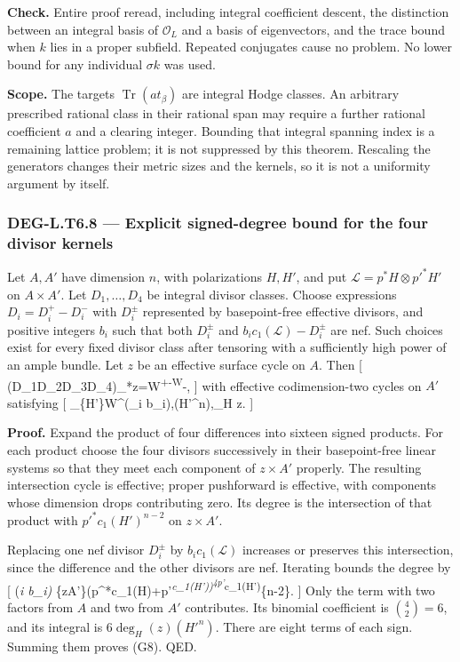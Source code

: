 \documentclass[11pt,a4paper]{article}
\theoremstyle{definition}
\begin{document}
\textbf{Check.} Entire proof reread, including integral coefficient
descent, the distinction between an integral basis of \(\mathcal O_L\)
and a basis of eigenvectors, and the trace bound when \(k\) lies in a
proper subfield. Repeated conjugates cause no problem. No lower bound
for any individual \(\sigma k\) was used.

\textbf{Scope.} The targets \(\operatorname{Tr}(a t_\beta)\) are
integral Hodge classes. An arbitrary prescribed rational class in their
rational span may require a further rational coefficient \(a\) and a
clearing integer. Bounding that integral spanning index is a remaining
lattice problem; it is not suppressed by this theorem. Rescaling the
generators changes their metric sizes and the kernels, so it is not a
uniformity argument by itself.

\subsubsection{DEG-L.T6.8 --- Explicit signed-degree bound for the four
divisor
kernels}\label{deg-l.t6.8-explicit-signed-degree-bound-for-the-four-divisor-kernels}

Let \(A,A'\) have dimension \(n\), with polarizations \(H,H'\), and put
\(\mathscr L=p^*H\otimes p'^*H'\) on \(A\times A'\). Let
\(D_1,\ldots,D_4\) be integral divisor classes. Choose expressions
\(D_i=D_i^+-D_i^-\) with \(D_i^\pm\) represented by basepoint-free
effective divisors, and positive integers \(b_i\) such that both
\(D_i^\pm\) and \(b_i c_1(\mathscr L)-D_i^\pm\) are nef. Such choices
exist for every fixed divisor class after tensoring with a sufficiently
high power of an ample bundle. Let \(z\) be an effective surface cycle
on \(A\). Then {[} (D\_1D\_2D\_3D\_4)\_*z=W\textsuperscript{+-W}-, {]}
with effective codimension-two cycles on \(A'\) satisfying {[}
\deg\_\{H'\}W\^{}\pm{}\Bigl(\prod\_i b\_i\Bigr),(H'\^{}n),\deg\_H z.
 {]}

\textbf{Proof.} Expand the product of four differences into sixteen
signed products. For each product choose the four divisors successively
in their basepoint-free linear systems so that they meet each component
of \(z\times A'\) properly. The resulting intersection cycle is
effective; proper pushforward is effective, with components whose
dimension drops contributing zero. Its degree is the intersection of
that product with \(p'^*c_1(H')^{n-2}\) on \(z\times A'\).

Replacing one nef divisor \(D_i^\pm\) by \(b_i c_1(\mathscr L)\)
increases or preserves this intersection, since the difference and the
other divisors are nef. Iterating bounds the degree by {[}
\Bigl(\prod\emph{i b\_i\Bigr)
\int}\{z\times A'\}(p\^{}*c\_1(H)+p'\textsuperscript{\emph{c\_1(H'))\textsuperscript{4p'}}c\_1(H')}\{n-2\}.
{]} Only the term with two factors from \(A\) and two from \(A'\)
contributes. Its binomial coefficient is \(\binom42=6\), and its
integral is \(6\deg_H(z)(H'^n)\). There are eight terms of each sign.
Summing them proves (G8). QED.
\end{document}
